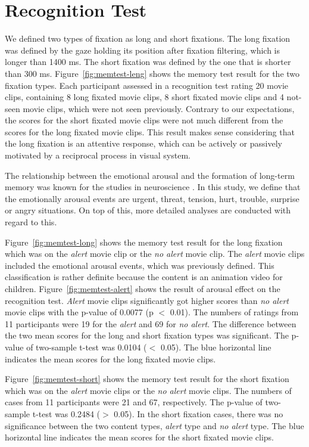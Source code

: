 \documentclass[oneside,master]{snueethesis}
\begin{document}
\section{Recognition Test}

We defined two types of fixation as long and short fixations. The long fixation was defined by the gaze holding its position after fixation filtering, which is longer than 1400 ms. The short fixation was defined by the one that is shorter than 300 ms. Figure~\ref{fig:memtest-leng} shows the memory test result for the two fixation types. Each participant assessed in a recognition test rating 20 movie clips, containing 8 long fixated movie clips, 8 short fixated movie clips and 4 not-seen movie clips, which were not seen previously. Contrary to our expectations, the scores for the short fixated movie clips were not much different from the scores for the long fixated movie clips. This result makes sense considering that the long fixation is an attentive response, which can be actively or passively motivated by a reciprocal process in visual system.

The relationship between the emotional arousal and the formation of long-term memory was known for the studies in neuroscience \cite{Cahill1996amyg,Cahill1998baso}. In this study, we define that the emotionally arousal events are urgent, threat, tension, hurt, trouble, surprise or angry situations. On top of this, more detailed analyses are conducted with regard to this.

Figure~\ref{fig:memtest-long} shows the memory test result for the long fixation which was on the \textit{alert} movie clip or the \textit{no alert} movie clip. The \textit{alert} movie clips included the emotional arousal events, which was previously defined. This classification is rather definite because the content is an animation video for children. Figure~\ref{fig:memtest-alert} shows the result of arousal effect on the recognition test. \textit{Alert} movie clips significantly got higher scores than \textit{no alert} movie clips with the p-value of 0.0077 (p $<$ 0.01). The numbers of ratings from 11 participants were 19 for the \textit{alert} and 69 for \textit{no alert}. The difference between the two mean scores for the long and short fixation types was significant. The p-value of two-sample t-test was 0.0104 ($<$ 0.05). The blue horizontal line indicates the mean scores for the long fixated movie clips.

Figure~\ref{fig:memtest-short} shows the memory test result for the short fixation which was on the \textit{alert} movie clips or the \textit{no alert} movie clips. The numbers of cases from 11 participants were 21 and 67, respectively. The p-value of two-sample t-test was 0.2484 ($>$ 0.05). In the short fixation cases, there was no significance between the two content types, \textit{alert} type and \textit{no alert} type. The blue horizontal line indicates the mean scores for the short fixated movie clips.
\end{document}
